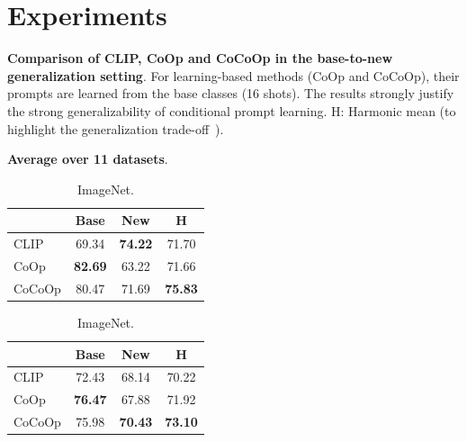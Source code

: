 \documentclass[10pt,twocolumn,letterpaper]{article}
\newcommand{\tableCellHeight}{1}
\newcommand{\tabstyle}[1]{
  \setlength{\tabcolsep}{#1}
  \renewcommand{\arraystretch}{\tableCellHeight}
  \centering
  \small
}
\begin{document}
\section{Experiments}
\label{sec:experiments}


\begin{table}[t]
    \tabstyle{6pt}
    \caption{\textbf{Comparison of CLIP, CoOp and CoCoOp in the base-to-new generalization setting}. For learning-based methods (CoOp and CoCoOp), their prompts are learned from the base classes (16 shots). The results strongly justify the strong generalizability of conditional prompt learning. H: Harmonic mean (to highlight the generalization trade-off~\cite{xian2017zero}).}
    \label{tab:results_generalization}
    \begin{subtable}[t]{.3\textwidth}
    \centering
    \caption{\textbf{Average over 11 datasets}.}
    \begin{tabular}{l cc|c}
    \toprule
    & Base & New & H \\
    \midrule
    CLIP & 69.34 & \textbf{74.22} & 71.70 \\
    CoOp & \textbf{82.69} & 63.22 & 71.66 \\
    \rowcolor{tabhighlight}
    CoCoOp & 80.47 & 71.69 & \textbf{75.83} \\
    \bottomrule
    \end{tabular}
    \end{subtable}
    \vspace{1em}
    \begin{subtable}[t]{.3\textwidth}
    \centering
    \caption{ImageNet.}
    \begin{tabular}{l cc|c}
    \toprule
    & Base & New & H \\
    \midrule
    CLIP & 72.43 & 68.14 & 70.22 \\
    CoOp & \textbf{76.47} & 67.88 & 71.92\\
    \rowcolor{tabhighlight}
    CoCoOp & 75.98 & \textbf{70.43} & \textbf{73.10} \\

\end{tabular}
\end{subtable}
\end{table}
\end{document}
